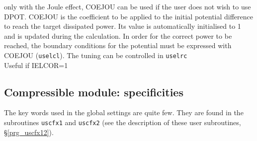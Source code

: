 {only with the Joule effect, COEJOU can be used if the user does not 
wish to use DPOT. COEJOU is the coefficient to be applied to the initial
potential difference to reach the target dissipated power. Its value is
automatically initialised to 1 and is updated during the calculation. 
In order for the correct power to be reached, the boundary
conditions for the potential must be expressed with COEJOU (\texttt{uselcl}). The
tuning can be controlled in \texttt{uselrc}\\
Useful if IELCOR=1}

\subsection{Compressible module: specificities}

The key words used in the global settings are quite few. They are
found in the subroutines \texttt{uscfx1} and \texttt{uscfx2} (see the
description of these user subroutines, \S\ref{prg_uscfx12}).

